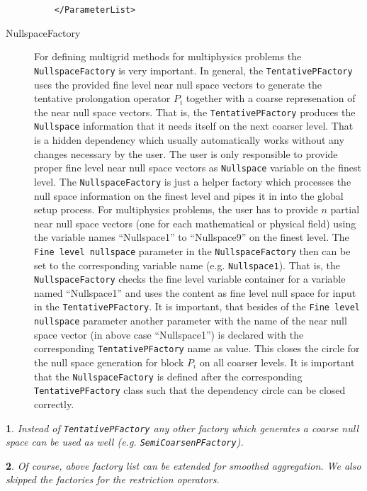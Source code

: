 \documentclass[10pt,fleqn]{book}
\newtheorem*{mycomment}{\ding{42}}
\begin{document}
\begin{description}
\begin{lstlisting}
    </ParameterList>
\end{lstlisting}
\item[NullspaceFactory] For defining multigrid methods for multiphysics problems the \texttt{NullspaceFactory} is very important. In general, the \texttt{TentativePFactory} uses the provided fine level near null space vectors to generate the tentative prolongation operator $P_i$ together with a coarse represenation of the near null space vectors. That is, the \texttt{TentativePFactory} produces the \texttt{Nullspace} information that it needs itself on the next coarser level. That is a hidden dependency which usually automatically works without any changes necessary by the user. The user is only responsible to provide proper fine level near null space vectors as \texttt{Nullspace} variable on the finest level.
The \texttt{NullspaceFactory} is just a helper factory which processes the null space information on the finest level and pipes it in into the global setup process. For multiphysics problems, the user has to provide $n$ partial near null space vectors (one for each mathematical or physical field) using the variable names ``Nullspace1'' to ``Nullspace9'' on the finest level. The \texttt{Fine level nullspace} parameter in the \texttt{NullspaceFactory} then can be set to the corresponding variable name (e.g. \texttt{Nullspace1}). That is, the \texttt{NullspaceFactory} checks the fine level variable container for a variable named ``Nullspace1'' and uses the content as fine level null space for input in the \texttt{TentativePFactory}. It is important, that besides of the \texttt{Fine level nullspace} parameter another parameter with the name of the near null space vector (in above case ``Nullspace1'') is declared with the corresponding \texttt{TentativePFactory} name as value. This closes the circle for the null space generation for block $P_i$ on all coarser levels.
It is important that the \texttt{NullspaceFactory} is defined after the corresponding \texttt{TentativePFactory} class such that the dependency circle can be closed correctly.
\end{description}
\begin{mycomment}
Instead of \texttt{TentativePFactory} any other factory which generates a coarse null space can be used as well (e.g. \texttt{SemiCoarsenPFactory}).
\end{mycomment}
\begin{mycomment}
Of course, above factory list can be extended for smoothed aggregation. We also skipped the factories for the restriction operators.
\end{mycomment}
\end{document}
